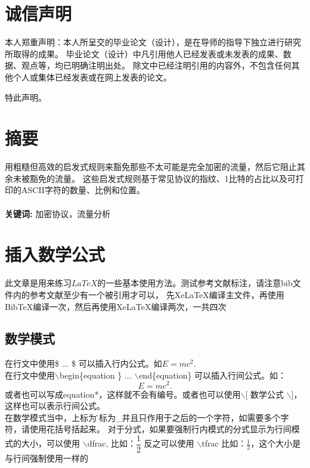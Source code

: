\documentclass{thesis}
\begin{document}

\section*{诚信声明}

本人郑重声明：本人所呈交的毕业论文（设计），是在导师的指导下独立进行研究所取得的成果。
毕业论文（设计）中凡引用他人已经发表或未发表的成果、数据、观点等，均已明确注明出处。
除文中已经注明引用的内容外，不包含任何其他个人或集体已经发表或在网上发表的论文。

特此声明。
\newpage
\section*{摘要} %
用粗糙但高效的启发式规则来豁免那些不太可能是完全加密的流量，然后它阻止其余未被豁免的流量。
这些启发式规则基于常见协议的指纹、1比特的占比以及可打印的ASCII字符的数量、比例和位置。\\ \\
\noindent \textbf{关键词:} 加密协议，流量分析


\newpage

\tableofcontents  %

\newpage

\section{插入数学公式}
此文章是用来练习$LaTeX$的一些基本使用方法\cite{sunliguang2016jidi}。测试参考文献标注，请注意bib文件内的参考文献至少有一个被引用才可以，
先XeLaTeX编译主文件，再使用BibTeX编译一次，然后再使用XeLaTeX编译两次，一共四次\cite{sample2023}
\subsection{数学模式}
在行文中使用\$ ... \$ 可以插入行内公式。如$E=mc^2$.\\
在行文中使用$\backslash$begin\{equation \} ... $\backslash$end\{equation\} 可以插入行间公式。如：
\begin{equation}
E=mc^2.
\end{equation}
或者也可以写成equation*，这样就不会有编号。或者也可以使用$\backslash$[ 数学公式 $\backslash$]，
这样也可以表示行间公式。\\在数学模式当中，上标为\^下标为\_并且只作用于之后的一个字符，如需要多个字符，请使用花括号括起来。
对于分式，如果要强制行内模式的分式显示为行间模式的大小，可以使用 $\backslash$dfrac, 
比如：$ \dfrac{1}{2} $
反之可以使用 $\backslash$tfrac
比如：$ \tfrac{1}{2} $，这个大小是与行间强制使用一样的
\end{document}
